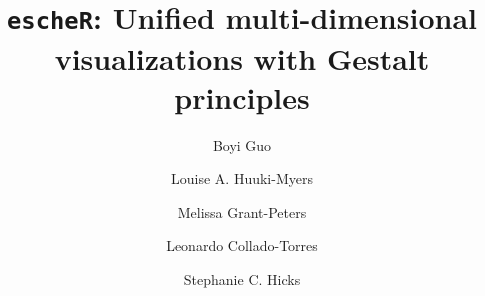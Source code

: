 \documentclass[unnumsec,webpdf,modern,large,namedate]{oup-authoring-template}%
\theoremstyle{thmstyleone}%
\theoremstyle{thmstyletwo}%
\theoremstyle{thmstylethree}%
\begin{document}



\title[escheR]{\texttt{escheR}: Unified multi-dimensional visualizations with Gestalt principles}


\author[1]{Boyi Guo}
\author[2]{Louise A. Huuki-Myers}
\author[3,4]{Melissa Grant-Peters}
\author[1,2]{Leonardo Collado-Torres}
\author[1,5,6,7, $\ast$]{Stephanie C. Hicks}


\address[1]{Department of Biostatistics, Johns Hopkins Bloomberg School of Public Health, MD, USA} 
\address[2]{Lieber Institute for Brain Development, Johns Hopkins Medical Campus, Baltimore, MD, USA}
\address[3]{Genetics and Genomic Medicine, Great Ormond Street Institute of Child Health, University College London, London, UK}
\address[4]{Aligning Science Across Parkinson’s (ASAP) Collaborative Research Network, Chevy Chase, MD, USA}
\address[5]{Department of Biomedical Engineering, Johns Hopkins School of Medicine, Baltimore, MD, USA}
\address[6]{Center for Computational Biology, Johns Hopkins University, Baltimore, MD, USA}
\address[7]{Malone Center for Engineering in Healthcare, Johns Hopkins University, MD, USA}


\end{document}
